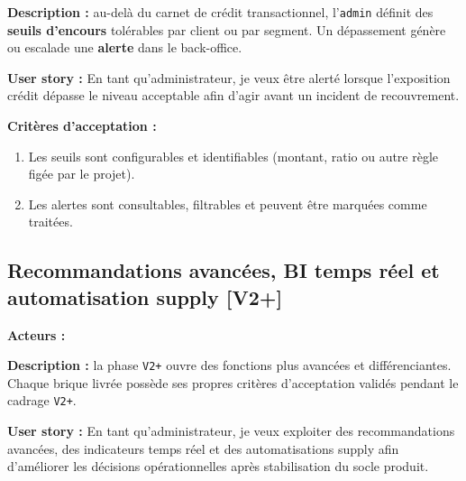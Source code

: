 \documentclass[11pt,a4paper]{scrreprt}
\newcommand{\code}[1]{\texttt{#1}}
\newcommand{\phase}[1]{\textbf{\textcolor{SplinAmber}{#1}}}
\newcommand{\actorbadge}[1]{\highlight{\code{#1}}}
\begin{document}
\textbf{Description :} au-delà du carnet de crédit transactionnel, l'\code{admin} définit des \textbf{seuils d'encours} tolérables par client ou par segment. Un dépassement génère ou escalade une \textbf{alerte} dans le back-office.

\textbf{User story :} En tant qu'administrateur, je veux être alerté lorsque l'exposition crédit dépasse le niveau acceptable afin d'agir avant un incident de recouvrement.

\textbf{Critères d'acceptation :}
\begin{enumerate}
  \item Les seuils sont configurables et identifiables (montant, ratio ou autre règle figée par le projet).
  \item Les alertes sont consultables, filtrables et peuvent être marquées comme traitées.
\end{enumerate}

\subsection{Recommandations avancées, BI temps réel et automatisation supply \phase{[V2+]}}
\textbf{Acteurs :} \actorbadge{ADMIN} \actorbadge{SYSTEM}

\textbf{Description :} la phase \code{V2+} ouvre des fonctions plus avancées et différenciantes. Chaque brique livrée possède ses propres critères d'acceptation validés pendant le cadrage \code{V2+}.

\textbf{User story :} En tant qu'administrateur, je veux exploiter des recommandations avancées, des indicateurs temps réel et des automatisations supply afin d'améliorer les décisions opérationnelles après stabilisation du socle produit.
\end{document}
